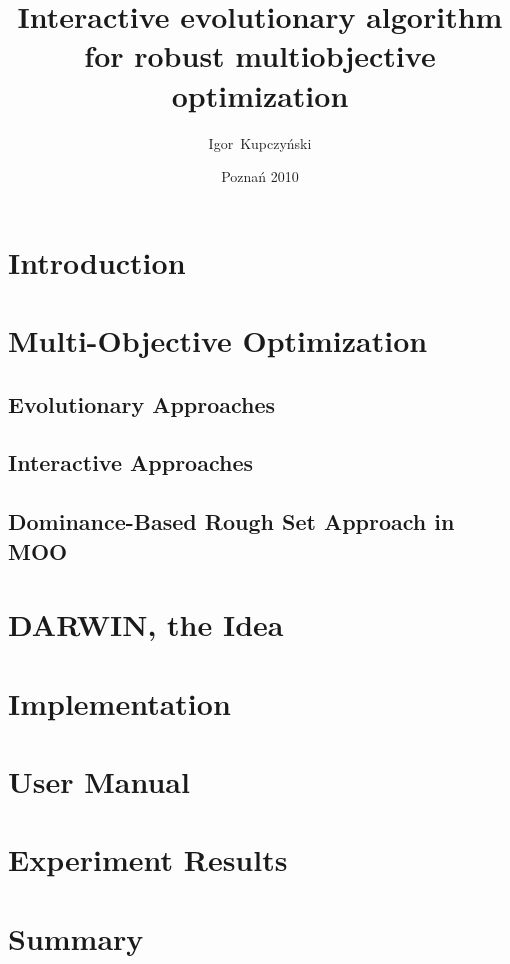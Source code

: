 \documentclass[a4paper,english,thesis]{dcsbook}
\author{Igor~Kupczy\'nski}
\date{Pozna\'n 2010}
\title{Interactive evolutionary algorithm \\ for robust multiobjective
  optimization}
\begin{document}
\maketitle
\frontmatter
\tableofcontents{}
\mainmatter

\chapter{Introduction}

\chapter{Multi-Objective Optimization}
\section{Evolutionary Approaches}
\section{Interactive Approaches}
\section{Dominance-Based Rough Set Approach in MOO}

\chapter{DARWIN, the Idea}

\chapter{Implementation}
\chapter{User Manual}

\chapter{Experiment Results}


\chapter{Summary}


\backmatter



\end{document}
